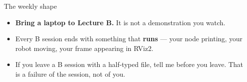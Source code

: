 \documentclass[aspectratio=169]{beamer}
\begin{document}
\begin{frame}{The weekly shape}
  \begin{center}
  \end{center}

  \vspace{0.5em}
  \begin{itemize}
    \item \textbf{Bring a laptop to Lecture B.} It is not a demonstration you watch.
    \item Every B session ends with something that \textbf{runs} --- your node printing,
          your robot moving, your frame appearing in RViz2.
    \item If you leave a B session with a half-typed file, tell me before you leave. That
          is a failure of the session, not of you.
  \end{itemize}
\end{frame}
\end{document}
